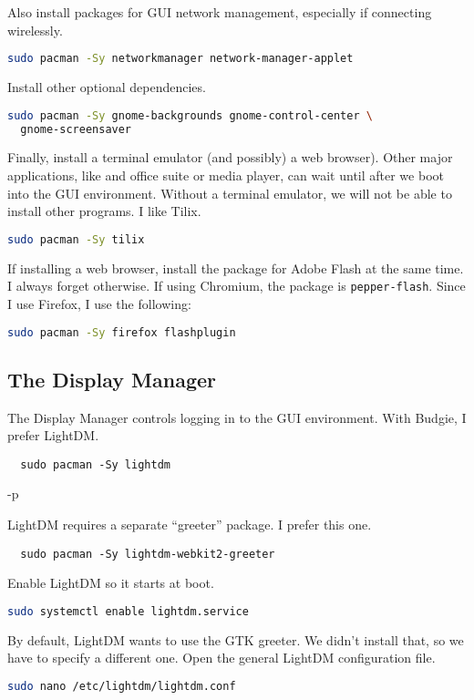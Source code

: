 \documentclass[letterpaper,12pt]{article}
\newcommand{\p}{\par\bigskip}
\begin{document}
Also install packages for GUI network management, especially if connecting wirelessly.
\begin{lstlisting}[language=bash]
  sudo pacman -Sy networkmanager network-manager-applet
\end{lstlisting} \p

Install other optional dependencies.
\begin{lstlisting}[language=bash]
  sudo pacman -Sy gnome-backgrounds gnome-control-center \
  gnome-screensaver 
\end{lstlisting} \p

Finally, install a terminal emulator (and possibly) a web browser). Other major applications, like and office suite or media player, can wait until after we boot into the GUI environment. Without a terminal emulator, we will not be able to install other programs. I like Tilix.
\begin{lstlisting}[language=bash]
  sudo pacman -Sy tilix
\end{lstlisting} \p

If installing a web browser, install the package for Adobe Flash at the same time. I always forget otherwise. If using Chromium, the package is {\tt pepper-flash}. Since I use Firefox, I use the following:
\begin{lstlisting}[language=bash]
  sudo pacman -Sy firefox flashplugin
\end{lstlisting}


\subsection{The Display Manager}
The Display Manager controls logging in to the GUI environment. With Budgie, I prefer LightDM.
\begin{lstlisting}
  sudo pacman -Sy lightdm
\end{lstlisting} -p

LightDM requires a separate ``greeter'' package. I prefer this one.
\begin{lstlisting}
  sudo pacman -Sy lightdm-webkit2-greeter
\end{lstlisting} \p

Enable LightDM so it starts at boot.
\begin{lstlisting}[language=bash]
  sudo systemctl enable lightdm.service
\end{lstlisting} \p

By default, LightDM wants to use the GTK greeter. We didn't install that, so we have to specify a different one. Open the general LightDM configuration file.
\begin{lstlisting}[language=bash]
  sudo nano /etc/lightdm/lightdm.conf
\end{lstlisting} \p
\end{document}
